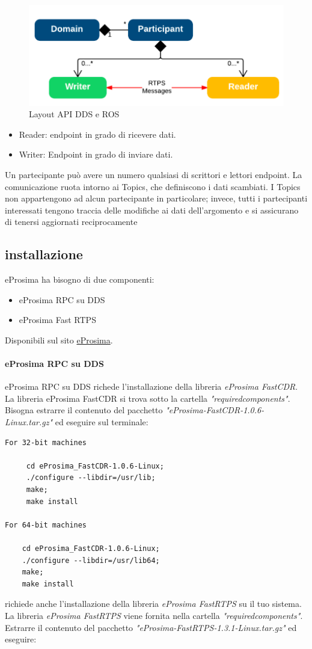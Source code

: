 \documentclass[a4paper]{article}
\begin{document}
\begin{figure}[htbp]
\centering
\includegraphics[scale=0.5]{dds_img1.PNG} 
\caption{Layout API DDS e ROS}
\end{figure}

\begin{itemize}
\item Reader: endpoint in grado di ricevere dati.

\item Writer: Endpoint in grado di inviare dati.
\end{itemize}

Un partecipante può avere un numero qualsiasi di scrittori e lettori endpoint.
La comunicazione ruota intorno ai Topics, che definiscono i dati scambiati. I Topics non appartengono ad alcun partecipante in particolare; invece, tutti i partecipanti interessati tengono traccia delle modifiche ai dati dell'argomento e si assicurano di tenersi aggiornati reciprocamente
\subsection{installazione}
eProsima ha bisogno di due componenti:
\begin{itemize}
\item eProsima RPC su DDS
\item eProsima Fast RTPS
\end{itemize}

Disponibili sul sito \href{https://www.eprosima.com/}{eProsima}.
\paragraph{eProsima RPC su DDS}
eProsima RPC su DDS richede l'installazione della libreria \textit{eProsima FastCDR}. La libreria eProsima FastCDR si trova sotto la cartella
\textit{"requiredcomponents"}. Bisogna estrarre il contenuto del pacchetto \textit{"eProsima-FastCDR-1.0.6-Linux.tar.gz"}
ed eseguire sul terminale:
\begin{verbatim}
For 32-bit machines

     cd eProsima_FastCDR-1.0.6-Linux;
     ./configure --libdir=/usr/lib;
     make; 
     make install
     
For 64-bit machines

    cd eProsima_FastCDR-1.0.6-Linux; 
    ./configure --libdir=/usr/lib64;
    make;
    make install
\end{verbatim}
richiede anche l'installazione della libreria \textit{eProsima FastRTPS} su
il tuo sistema. La libreria \textit{eProsima FastRTPS} viene fornita nella cartella
\textit{"requiredcomponents"}. Estrarre il contenuto del pacchetto
\textit{"eProsima-FastRTPS-1.3.1-Linux.tar.gz"} ed eseguire:
\end{document}
